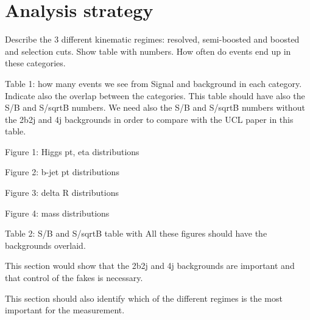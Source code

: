 
\section{Analysis strategy}
\label{sec:analysis}

Describe the 3 different kinematic regimes: resolved, semi-boosted and boosted and selection cuts. Show table with numbers. How often do events end up in these categories.

Table 1: how many events we see from Signal and background in each category. Indicate also the overlap between the categories. This table should have also the S/B and S/sqrtB numbers. We need also the S/B and S/sqrtB numbers without the 2b2j and 4j backgrounds in order to compare with the UCL paper in this table.

Figure 1: Higgs pt, eta distributions

Figure 2: b-jet pt distributions

Figure 3: delta R distributions

Figure 4: mass distributions

Table 2: S/B and S/sqrtB table with
All these figures should have the backgrounds overlaid.

This section would show that the 2b2j and 4j backgrounds are important and that control of the fakes is necessary.

This section should also identify which of the different regimes is the most important for the measurement.

